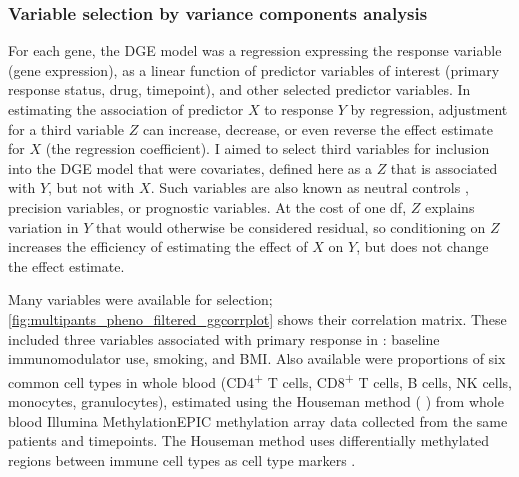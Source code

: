 \subsubsection{Variable selection by variance components analysis}
\label{subsubsec:multiPANTS_var_selection}

For each gene, the \gls{DGE} model was a regression expressing the response variable (gene expression), 
as a linear function of predictor variables of interest (primary response status, drug, timepoint),
and other selected predictor variables.
In estimating the association of predictor $X$ to response $Y$ by regression, 
adjustment for a third variable $Z$ can increase, decrease, or even reverse the effect estimate for $X$ (the regression coefficient).
I aimed to select third variables for inclusion into the \gls{DGE} model that were covariates,
defined here as a $Z$ that is associated with $Y$, but not with $X$.
Such variables are also known as neutral controls \autocite{cinelli2020CrashCourseGood}, precision variables, or prognostic variables.
At the cost of one \gls{df},
$Z$ explains variation in $Y$ that would otherwise be considered residual,
so conditioning on $Z$ increases the efficiency of estimating the effect of $X$ on $Y$, but does not change the effect estimate.

Many variables were available for selection;
\cref{fig:multipants_pheno_filtered_ggcorrplot} shows their correlation matrix.
These included three variables associated with primary response in \textcite{kennedy2019PredictorsAntiTNFTreatment}: baseline immunomodulator use, smoking, and \gls{BMI}.
Also available were proportions of six common cell types in whole blood 
(CD4\textsuperscript{+} T cells, CD8\textsuperscript{+} T cells, B cells, \gls{NK} cells, monocytes, granulocytes),
estimated using the Houseman method ( \autocite{aryee2014MinfiFlexibleComprehensive})
from whole blood Illumina MethylationEPIC methylation array data collected from the same patients and timepoints.
The Houseman method uses differentially methylated regions between immune cell types as cell type markers \autocite{houseman2012DNAMethylationArrays}.

